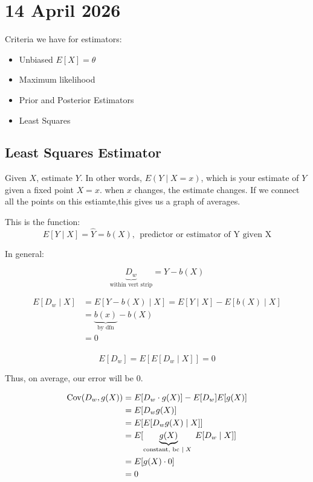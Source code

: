 \documentclass{report}
\begin{document}
\section{14 April 2026} 

Criteria we have for estimators: 
\begin{itemize}
	\item Unbiased $E[X] = \theta$ 
	\item Maximum likelihood
	\item Prior and Posterior Estimators 
	\item Least Squares
\end{itemize}

\subsection{Least Squares Estimator}

Given $X$, estimate $Y$. 
In other words, $E(Y\mid X = x)$, which is your estimate of $Y$ given a fixed point $X=x$. when $x$ changes, the estimate changes. If we connect all the points on this estiamte,this gives us a graph of averages. 

This is the function: 
\[
E[Y \mid X] = \hat Y = b(X), ~~\text{predictor or estimator of Y given X}
\]

In general: 

\[
	\underbrace{D_{w}}_{\text{within vert strip}} = Y - b(X)
\]

\begin{align*}
	E[D_{w} \mid X] &= E[Y-b(X) \mid X] = E[Y \mid X] - E[b(X) \mid X] \\
			&= \underbrace{b(x)}_{\text{by dfn}} - b(X) \\
	&= 0 \\
\end{align*}

\[
	E[D_{w}] = E[E[D_{w} \mid X]] = 0
\]

Thus, on average, our error will be 0.

\begin{align*}
	\operatorname{Cov}(D_{w}, g(X)) &= E[D_{w} \cdot g(X)] - E[D_{w}] E[g(X)] \\
	&= E[D_{w}g(X)] \\
	&= E[E[D_{w}g(X) \mid X]] \\
	&= E[\underbrace{g(X)}_{\text{constant, bc $\mid X$ }}E[D_{w} \mid X]] \\
	&= E[g(X) \cdot  0] \\
	&= 0 \\
\end{align*}
\end{document}
